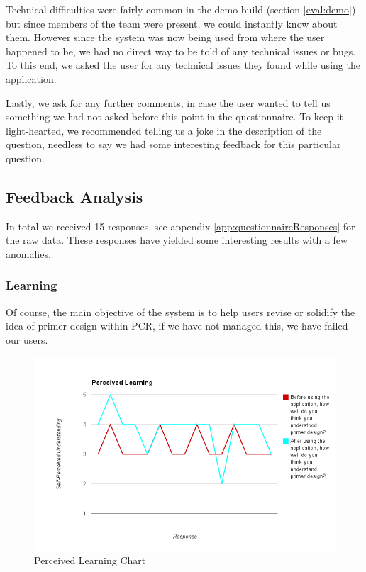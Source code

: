 Technical difficulties were fairly common in the demo build (section
\ref{eval:demo}) but since members of the team were present, we could
instantly know about them.
However since the system was now being used from where the user
happened to be, we had no direct way to be told of any technical
issues or bugs.
To this end, we asked the user for any technical issues they found
while using the application.

Lastly, we ask for any further comments, in case the user wanted to
tell us something we had not asked before this point in the
questionnaire.
To keep it light-hearted, we recommended telling us a joke in the
description of the question, needless to say we had some interesting
feedback for this particular question.

\subsection{Feedback Analysis}

In total we received 15 responses, see appendix
\ref{app:questionnaireResponses} for the raw data.
These responses have yielded some interesting results with a few
anomalies.

\subsubsection{Learning}

Of course, the main objective of the system is to help users revise or
solidify the idea of primer design within PCR, if we have not managed
this, we have failed our users.

\begin{figure}[!t]
  \begin{center}
    \includegraphics[width=\textwidth]{./images/perceivedLearning.png}
    \caption{Perceived Learning Chart}
    \label{fig:feedbackAnalysis:perceivedLearning}
  \end{center}
\end{figure}


